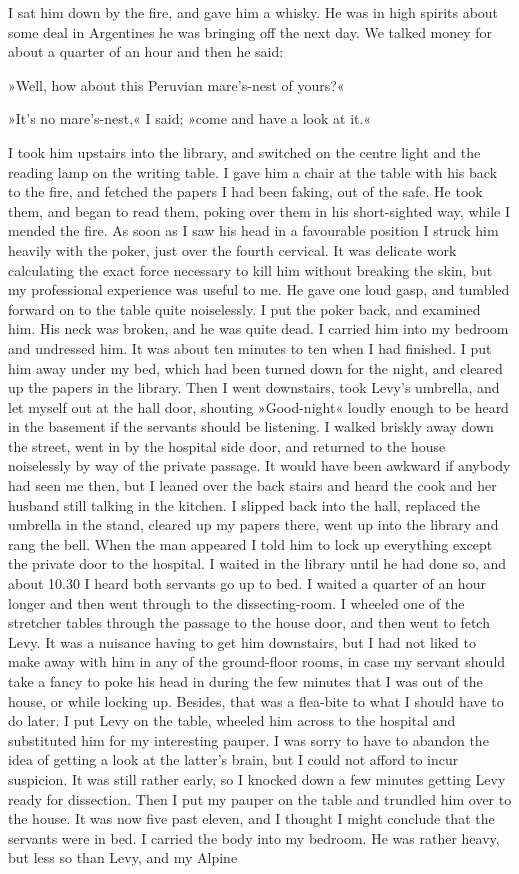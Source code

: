 I sat him down by the fire, and gave him a whisky. He was in high spirits about some deal in Argentines he was bringing off the next day. We talked money for about a quarter of an hour and then he said:

»Well, how about this Peruvian mare's-nest of yours?«

»It's no mare's-nest,« I said; »come and have a look at it.«

I took him upstairs into the library, and switched on the centre light and the reading lamp on the writing table. I gave him a chair at the table with his back to the fire, and fetched the papers I had been faking, out of the safe. He took them, and began to read them, poking over them in his short-sighted way, while I mended the fire. As soon as I saw his head in a favourable position I struck him heavily with the poker, just over the fourth cervical. It was delicate work calculating the exact force necessary to kill him without breaking the skin, but my professional experience was useful to me. He gave one loud gasp, and tumbled forward on to the table quite noiselessly. I put the poker back, and examined him. His neck was broken, and he was quite dead. I carried him into my bedroom and undressed him. It was about ten minutes to ten when I had finished. I put him away under my bed, which had been turned down for the night, and cleared up the papers in the library. Then I went downstairs, took Levy's umbrella, and let myself out at the hall door, shouting »Good-night« loudly enough to be heard in the basement if the servants should be listening. I walked briskly away down the street, went in by the hospital side door, and returned to the house noiselessly by way of the private passage. It would have been awkward if anybody had seen me then, but I leaned over the back stairs and heard the cook and her husband still talking in the kitchen. I slipped back into the hall, replaced the umbrella in the stand, cleared up my papers there, went up into the library and rang the bell. When the man appeared I told him to lock up everything except the private door to the hospital. I waited in the library until he had done so, and about 10.30 I heard both servants go up to bed. I waited a quarter of an hour longer and then went through to the dissecting-room. I wheeled one of the stretcher tables through the passage to the house door, and then went to fetch Levy. It was a nuisance having to get him downstairs, but I had not liked to make away with him in any of the ground-floor rooms, in case my servant should take a fancy to poke his head in during the few minutes that I was out of the house, or while locking up. Besides, that was a flea-bite to what I should have to do later. I put Levy on the table, wheeled him across to the hospital and substituted him for my interesting pauper. I was sorry to have to abandon the idea of getting a look at the latter's brain, but I could not afford to incur suspicion. It was still rather early, so I knocked down a few minutes getting Levy ready for dissection. Then I put my pauper on the table and trundled him over to the house. It was now five past eleven, and I thought I might conclude that the servants were in bed. I carried the body into my bedroom. He was rather heavy, but less so than Levy, and my Alpine 